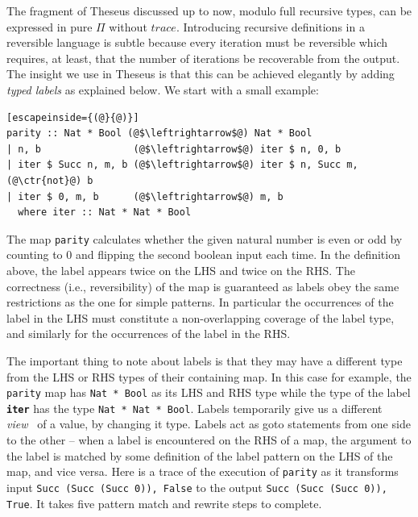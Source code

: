 \documentclass{article}
\newcommand{\kw}[1]{{\scriptsize{\textbf{\texttt{#1}}}}}
\newcommand{\ctr}[1]{{\scriptsize{\texttt{#1}}}}
\begin{document}
The fragment of Theseus discussed up to now, modulo full recursive types, can
be expressed in pure \ensuremath{\Pi } without \ensuremath{\mathit{trace}}.  Introducing recursive
definitions in a reversible language is subtle because every iteration must
be reversible which requires, at least, that the number of iterations be
recoverable from the output. The insight we use in Theseus is that this can
be achieved elegantly by adding \emph{typed labels} as explained below. We
start with a small example:

\begin{lstlisting}[escapeinside={(@}{@)}]
parity :: Nat * Bool (@$\leftrightarrow$@) Nat * Bool
| n, b                (@$\leftrightarrow$@) iter $ n, 0, b
| iter $ Succ n, m, b (@$\leftrightarrow$@) iter $ n, Succ m, (@\ctr{not}@) b
| iter $ 0, m, b      (@$\leftrightarrow$@) m, b
  where iter :: Nat * Nat * Bool
 \end{lstlisting}

\noindent The map \ctr{parity} calculates whether the given natural number is
even or odd by counting to {\scriptsize{0}} and flipping the second boolean
input each time. In the definition above, the label appears twice on the LHS
and twice on the RHS. The correctness (i.e., reversibility) of the map is
guaranteed as labels obey the same restrictions as the one for simple
patterns. In particular the occurrences of the label in the LHS must
constitute a non-overlapping coverage of the label type, and similarly for
the occurrences of the label in the RHS.

The important thing to note about labels is that they may have a
different type from the LHS or RHS types of their containing map. In
this case for example, the \ctr{parity} map has \lstinline{Nat * Bool}
as its LHS and RHS type while the type of the label \kw{iter} has the
type \lstinline{Nat * Nat * Bool}. Labels temporarily give us a
different \emph{view}~\cite{Wadler:1987:VWP:41625.41653} of a value,
by changing it type. Labels act as goto statements from one side to
the other -- when a label is encountered on the RHS of a map, the
argument to the label is matched by some definition of the label
pattern on the LHS of the map, and vice versa.  Here is a trace of the
execution of \ctr{parity} as it transforms input \ctr{Succ (Succ (Succ
  0)), False} to the output \ctr{Succ (Succ (Succ 0)), True}. It takes
five pattern match and rewrite steps to complete.
\end{document}
